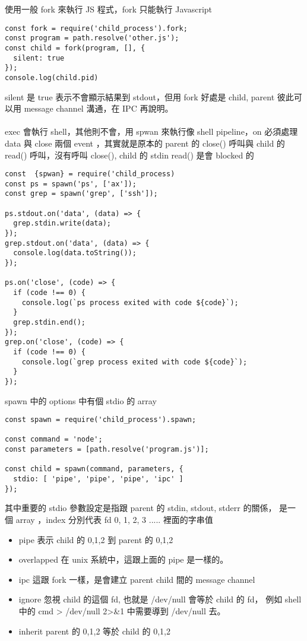   使用一般 fork 來執行 JS 程式，fork 只能執行 Javascript
  \begin{verbatim}
const fork = require('child_process').fork;
const program = path.resolve('other.js');
const child = fork(program, [], {
  silent: true
});
console.log(child.pid)
  \end{verbatim}
  silent 是 true 表示不會顯示結果到 stdout，但用 fork 好處是 child, parent
  彼此可以用 message channel 溝通，在 IPC 再說明。
  \\\\
  exec 會執行 shell，其他則不會，用 spwan 來執行像 shell pipeline，on
  必須處理 data 與 close 兩個 event ，其實就是原本的 parent 的 close()
  呼叫與 child 的 read() 呼叫，沒有呼叫 close(), child 的 stdin read()
  是會 blocked 的
  \begin{verbatim}
const  {spwan} = require('child_process)
const ps = spawn('ps', ['ax']);
const grep = spawn('grep', ['ssh']);

ps.stdout.on('data', (data) => {
  grep.stdin.write(data);
});
grep.stdout.on('data', (data) => {
  console.log(data.toString());
});

ps.on('close', (code) => {
  if (code !== 0) {
    console.log(`ps process exited with code ${code}`);
  }
  grep.stdin.end();
});
grep.on('close', (code) => {
  if (code !== 0) {
    console.log(`grep process exited with code ${code}`);
  }
});
  \end{verbatim}
  spawn 中的 options 中有個 stdio 的 array
  \begin{verbatim}
const spawn = require('child_process').spawn;

const command = 'node';
const parameters = [path.resolve('program.js')];

const child = spawn(command, parameters, {
  stdio: [ 'pipe', 'pipe', 'pipe', 'ipc' ]
});
  \end{verbatim}
  其中重要的 stdio 參數設定是指跟 parent 的 stdin, stdout, stderr 的關係，
  是一個 array ，index 分別代表 fd 0, 1, 2, 3 ..... 裡面的字串值
  \begin{itemize}
    \item pipe 表示 child 的 0,1,2 到  parent 的 0,1,2
    \item overlapped 在 unix 系統中，這跟上面的 pipe 是一樣的。
    \item ipc 這跟 fork 一樣，是會建立 parent child 間的 message channel
    \item ignore 忽視 child 的這個 fd, 也就是 /dev/null 會等於 child 的 fd，
      例如 shell 中的 cmd > /dev/null 2>\&1 中需要導到 /dev/null 去。
    \item inherit parent 的 0,1,2 等於 child 的 0,1,2
  \end{itemize}
